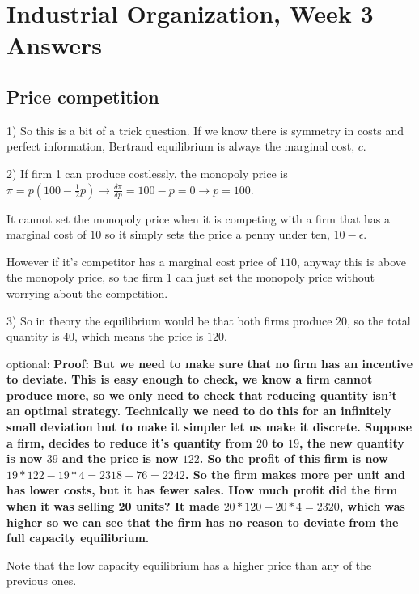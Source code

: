 \documentclass[12pt]{report}
\numberwithin{equation}{section}
\begin{document}
\section{Industrial Organization, Week 3 Answers}


\subsection{Price competition}

1) So this is a bit of a trick question. If we know there is symmetry in costs and perfect information, Bertrand equilibrium is always the marginal cost, $c$.

2) If firm 1 can produce costlessly, the monopoly price is $\pi=p(100-\frac{1}{2}p) \rightarrow \frac{\delta \pi}{\delta p} = 100-p=0 \rightarrow p=100$. 

It cannot set the monopoly price when it is competing with a firm that has a marginal cost of $10$ so it simply sets the price a penny under ten, $10-\epsilon$.

However if it's competitor has a marginal cost price of $110$, anyway this is above the monopoly price, so the firm 1 can just set the monopoly price without worrying about the competition. 

3) So in theory the equilibrium would be that both firms produce $20$, so the total quantity is $40$, which means the price is $120$. 

optional:
\textbf{Proof: But we need to make sure that no firm has an incentive to deviate. This is easy enough to check, we know a firm cannot produce more, so we only need to check that reducing quantity isn't an optimal strategy. Technically we need to do this for an infinitely small deviation but to make it simpler let us make it discrete. Suppose a firm, decides to reduce it's quantity from $20$ to $19$, the new quantity is now $39$ and the price is now $122$. So the profit of this firm is now $19*122-19*4=2318-76=2242$. So the firm makes more per unit and has lower costs, but it has fewer sales. How much profit did the firm when it was selling 20 units? It made $20*120-20*4=2320$, which was higher so we can see that the firm has no reason to deviate from the full capacity equilibrium.}

Note that the low capacity equilibrium has a higher price than any of the previous ones. 

\newpage
\end{document}
